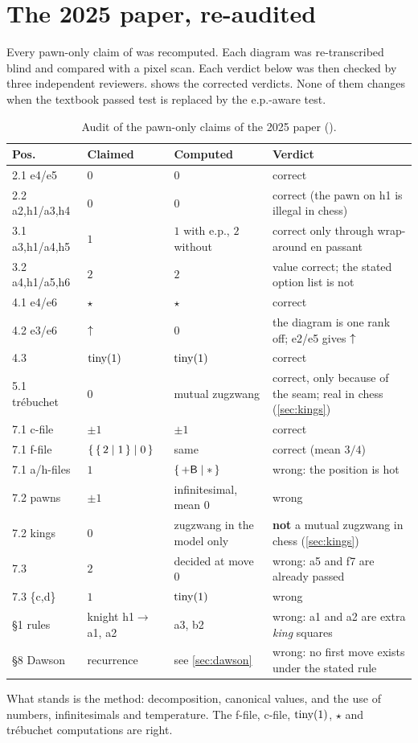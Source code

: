 \section{The 2025 paper, re-audited}\label{sec:audit}

Every pawn-only claim of \citet{Bhattacharjee2025} was recomputed. Each diagram was re-transcribed blind and
compared with a pixel scan. Each verdict below was then checked by three independent reviewers.
 shows the corrected verdicts. None of them changes when the textbook passed test is replaced
by the e.p.-aware test.

\begin{table}[ht]
\centering\small
\begin{tabularx}{\textwidth}{@{}l l l X@{}}
\toprule
Pos. & Claimed & Computed & Verdict \\
\midrule
2.1 e4/e5 & $0$ & $0$ & correct \\
2.2 a2,h1/a3,h4 & $0$ & $0$ & correct (the pawn on h1 is illegal in chess) \\
3.1 a3,h1/a4,h5 & $1$ & $1$ with e.p., $2$ without & correct only through wrap-around en passant \\
3.2 a4,h1/a5,h6 & $2$ & $2$ & value correct; the stated option list is not \\
4.1 e4/e6 & $\star$ & $\star$ & correct \\
4.2 e3/e6 & $\mathord{\uparrow}$ & $0$ & the diagram is one rank off; e2/e5 gives $\mathord{\uparrow}$ \\
4.3 & $\operatorname{tiny}(1)$ & $\operatorname{tiny}(1)$ & correct \\
5.1 tr\'ebuchet & $0$ & mutual zugzwang & correct, only because of the seam; real in chess (\cref{sec:kings}) \\
7.1 c-file & $\pm1$ & $\pm1$ & correct \\
7.1 f-file & $\{\,\{\,2 \mid 1\,\} \mid 0\,\}$ & same & correct (mean $3/4$) \\
7.1 a/h-files & $1$ & $\{\,+\mathsf{B} \mid \mathord{\ast}\,\}$ & wrong: the position is hot \\
7.2 pawns & $\pm1$ & infinitesimal, mean $0$ & wrong \\
7.2 kings & $0$ & zugzwang in the model only & \textbf{not} a mutual zugzwang in chess (\cref{sec:kings}) \\
7.3 & $2$ & decided at move $0$ & wrong: a5 and f7 are already passed \\
7.3 \{c,d\} & $1$ & $\operatorname{tiny}(1)$ & wrong \\
\S1 rules & knight h1$\to$a1, a2 & a3, b2 & wrong: a1 and a2 are extra \emph{king} squares \\
\S8 Dawson & recurrence & see \cref{sec:dawson} & wrong: no first move exists under the stated rule \\
\bottomrule
\end{tabularx}
\caption{Audit of the pawn-only claims of the 2025 paper ().}
\label{tab:audit}
\end{table}

What stands is the method: decomposition, canonical values, and the use of numbers, infinitesimals and
temperature. The f-file, c-file, $\operatorname{tiny}(1)$, $\star$ and tr\'ebuchet computations are right.
